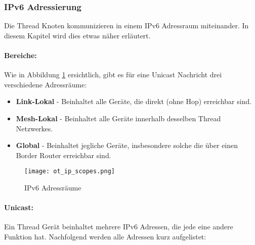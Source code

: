 \subsubsection{IPv6 Adressierung}\label{subsubsec:IPv6Adressierung}
Die Thread Knoten kommunizieren in einem IPv6 Adressraum miteinander. In diesem Kapitel wird dies etwas näher erläutert. \cite[Kapitel 5]{thread_group_inc_thread_2017}

\paragraph{Bereiche:}
Wie in Abbildung \ref{fig:IPv6Adressräume} ersichtlich, gibt es für eine Unicast Nachricht drei verschiedene Adressräume:

\begin{itemize}
	\item \textbf{Link-Lokal} - Beinhaltet alle Geräte, die direkt (ohne Hop) erreichbar sind.
	\item \textbf{Mesh-Lokal} - Beinhaltet alle Geräte innerhalb desselben Thread Netzwerkes.
	\item \textbf{Global} - Beinhaltet jegliche Geräte, insbesondere solche die über einen Border Router erreichbar sind.
\end{itemize}

\begin{figure}[H]
	\centering
	\texttt{[image: ot\_ip\_scopes.png]}
	\caption{IPv6 Adressräume \cite{openthread_ot-primer-scopes_2xpng_2016}}\label{fig:IPv6Adressräume}
\end{figure}

\paragraph{Unicast:}
Ein Thread Gerät beinhaltet mehrere IPv6 Adressen, die jede eine andere Funktion hat. Nachfolgend werden alle Adressen kurz aufgelistet: 

